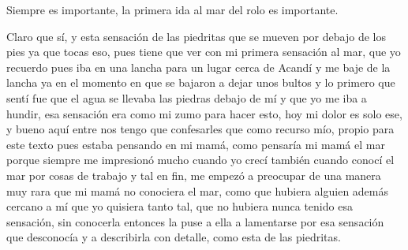 Siempre es importante, la primera ida al mar del rolo es importante.

Claro que sí, y esta sensación de las piedritas que se mueven por debajo de los pies ya que tocas eso, pues tiene que ver con mi primera sensación al mar, que yo recuerdo pues iba en una lancha para un lugar cerca de Acandí y me baje de la lancha ya en el momento en que se bajaron a dejar unos bultos y lo primero que sentí fue que el agua se llevaba las piedras debajo de mí y que yo me iba a hundir, esa sensación era como mi zumo para hacer esto, hoy mi dolor es solo ese, y bueno aquí entre nos tengo que confesarles que como recurso mío, propio para este texto pues estaba pensando en mi mamá, como pensaría mi mamá el mar porque siempre me impresionó mucho cuando yo crecí también cuando conocí el mar por cosas de trabajo y tal en fin, me empezó a preocupar de una manera muy rara que mi mamá no conociera el mar, como que hubiera alguien además cercano a mí que yo quisiera tanto tal, que no hubiera nunca tenido esa sensación, sin conocerla entonces la puse a ella a lamentarse por esa sensación que desconocía y a describirla con detalle, como esta de las piedritas. 

